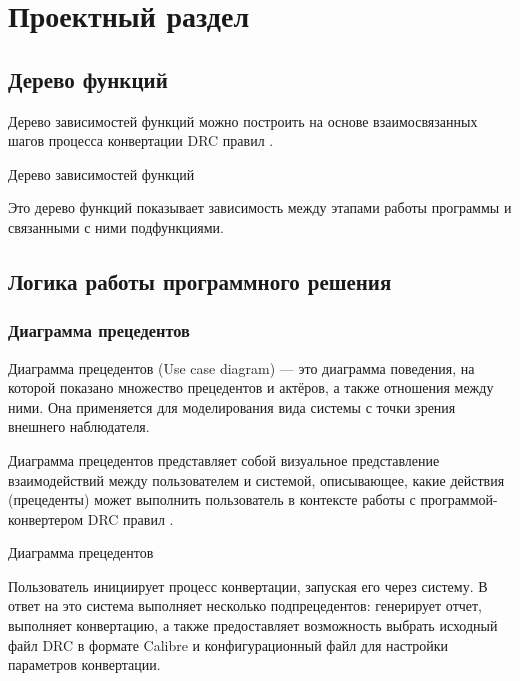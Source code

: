 \chapter{Проектный раздел}

\section{Дерево функций}

Дерево зависимостей функций можно построить на основе взаимосвязанных
шагов процесса конвертации DRC правил .

\begin{image}
	\caption{Дерево зависимостей функций}
	\label{fig:tree}
\end{image}

Это дерево функций показывает зависимость между этапами работы программы
и связанными с ними подфункциями.

\section{Логика работы программного решения}

\subsection{Диаграмма прецедентов}

Диаграмма прецедентов (Use case diagram) --- это диаграмма поведения,
на которой показано множество прецедентов и актёров,
а также отношения между ними. Она применяется для моделирования вида системы
с точки зрения внешнего наблюдателя.

Диаграмма прецедентов представляет собой визуальное представление
взаимодействий между пользователем и системой, описывающее,
какие действия (прецеденты) может выполнить пользователь
в контексте работы с программой-конвертером DRC правил .

\begin{image}
	\caption{Диаграмма прецедентов}
	\label{fig:use:case}
\end{image}

Пользователь инициирует процесс конвертации, запуская его через систему.
В ответ на это система выполняет несколько подпрецедентов:
генерирует отчет, выполняет конвертацию,
а также предоставляет возможность выбрать исходный файл DRC в формате Calibre
и конфигурационный файл для настройки параметров конвертации.

